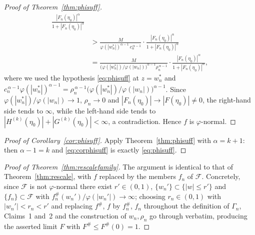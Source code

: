 \documentclass[10pt,a4paper]{amsart}
\begin{document}
\begin{proof}[Proof of Theorem~\textup{\ref{thm:phisuff}}]
\begin{align*}
\frac{|F_{n}(\eta_{0})|^{\alpha}}{1+|F_{n}(\eta_{0})|^{\alpha}}\\[0.4ex]
&>\frac{M}{\varphi(|w_{n}^{*}|)^{\alpha-1}\,c_{n}^{\,\alpha-1}}\cdot
\frac{|F_{n}(\eta_{0})|^{\alpha}}{1+|F_{n}(\eta_{0})|^{\alpha}}\\[0.4ex]
&=\frac{M}{\big(\varphi(|w_{n}^{*}|)/\varphi(|w_{n}|)\big)^{\alpha-1}\rho_{n}^{\,\alpha-1}}\cdot
\frac{|F_{n}(\eta_{0})|^{\alpha}}{1+|F_{n}(\eta_{0})|^{\alpha}},
\end{align*}
where we used the hypothesis \eqref{eq:phisuff} at $z=w_{n}^{*}$ and
$c_{n}^{\,\alpha-1}\varphi(|w_{n}^{*}|)^{\alpha-1}
=\rho_{n}^{\,\alpha-1}\big(\varphi(|w_{n}^{*}|)/\varphi(|w_{n}|)\big)^{\alpha-1}$. Since
$\varphi(|w_{n}^{*}|)/\varphi(|w_{n}|)\to1$, $\rho_{n}\to0$ and
$|F_{n}(\eta_{0})|\to|F(\eta_{0})|\neq0$, the right-hand side tends to $\infty$, while the
left-hand side tends to $|H^{(k)}(\eta_{0})|+|G^{(k)}(\eta_{0})|<\infty$, a contradiction.
Hence $f$ is $\varphi$-normal.
\end{proof}

\begin{proof}[Proof of Corollary~\textup{\ref{cor:phisuff}}]
Apply Theorem~\ref{thm:phisuff} with $\alpha=k+1$: then $\alpha-1=k$ and
\eqref{eq:corphisuff} is exactly \eqref{eq:phisuff}.
\end{proof}

\begin{proof}[Proof of Theorem~\textup{\ref{thm:rescalefamily}}]
The argument is identical to that of Theorem~\ref{thm:rescale}, with $f$ replaced by the
members $f_{n}$ of $\mathcal F$. Concretely, since $\mathcal F$ is not $\varphi$-normal there
exist $r'\in(0,1)$, $\{w_{n}'\}\subset\{|w|\le r'\}$ and $\{f_{n}\}\subset\mathcal F$ with
$f_{n}^{\#}(w_{n}')/\varphi(|w_{n}'|)\to\infty$; choosing $r_{n}\in(0,1)$ with
$|w_{n}'|<r_{n}<r'$ and replacing $f^{\#}$, $f$ by $f_{n}^{\#}$, $f_{n}$ throughout the
definition of $\Gamma_{n}$, Claims~1 and~2 and the construction of $w_{n},\rho_{n}$ go
through verbatim, producing the asserted limit $F$ with $F^{\#}\le F^{\#}(0)=1$.
\end{proof}
\end{document}
